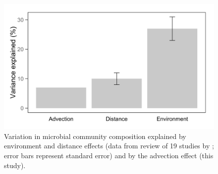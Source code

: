 \begin{figure}
  \centering
  \includegraphics[width=\textwidth]{../generaldiscussion/biogeographybarchart.png}
  \caption[Biogeographic effect sizes]{Variation in microbial community composition explained by environment and distance effects (data from review of 19 studies by \citet{Hanson:2012cb}; error bars represent standard error) and by the advection effect (this study).}
  \label{fig:biogeographybarchart}
\end{figure}
